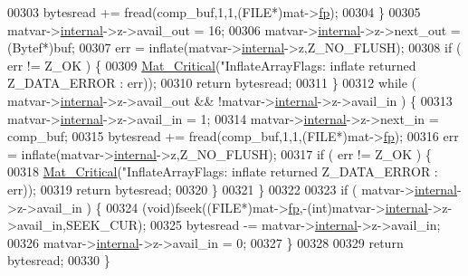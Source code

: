 \begin{DoxyCode}
{{{{{{00303         bytesread += fread(comp\_buf,1,1,(FILE*)mat->\hyperlink{struct__mat__t_a85f562e407ca9ad4d2a6e14f839432b7}{fp});
00304     \}
00305     matvar->\hyperlink{group___m_a_t_a6e97e3ed9f40c49322c18561c2a94e92}{internal}->z->avail\_out = 16;
00306     matvar->\hyperlink{group___m_a_t_a6e97e3ed9f40c49322c18561c2a94e92}{internal}->z->next\_out = (Bytef*)buf;
00307     err = inflate(matvar->\hyperlink{group___m_a_t_a6e97e3ed9f40c49322c18561c2a94e92}{internal}->z,Z\_NO\_FLUSH);
00308     \textcolor{keywordflow}{if} ( err != Z\_OK ) \{
00309         \hyperlink{group__mat__util_gaf51f2bfbb5580f575e4dd79757e2b80c}{Mat\_Critical}(\textcolor{stringliteral}{"InflateArrayFlags: inflate returned %
      Z\_DATA\_ERROR : err));
00310         \textcolor{keywordflow}{return} bytesread;
00311     \}
00312     \textcolor{keywordflow}{while} ( matvar->\hyperlink{group___m_a_t_a6e97e3ed9f40c49322c18561c2a94e92}{internal}->z->avail\_out && !matvar->\hyperlink{group___m_a_t_a6e97e3ed9f40c49322c18561c2a94e92}{internal}->z->avail\_in ) \{
00313         matvar->\hyperlink{group___m_a_t_a6e97e3ed9f40c49322c18561c2a94e92}{internal}->z->avail\_in = 1;
00314         matvar->\hyperlink{group___m_a_t_a6e97e3ed9f40c49322c18561c2a94e92}{internal}->z->next\_in = comp\_buf;
00315         bytesread += fread(comp\_buf,1,1,(FILE*)mat->\hyperlink{struct__mat__t_a85f562e407ca9ad4d2a6e14f839432b7}{fp});
00316         err = inflate(matvar->\hyperlink{group___m_a_t_a6e97e3ed9f40c49322c18561c2a94e92}{internal}->z,Z\_NO\_FLUSH);
00317         \textcolor{keywordflow}{if} ( err != Z\_OK ) \{
00318             \hyperlink{group__mat__util_gaf51f2bfbb5580f575e4dd79757e2b80c}{Mat\_Critical}(\textcolor{stringliteral}{"InflateArrayFlags: inflate returned %
      Z\_DATA\_ERROR : err));
00319             \textcolor{keywordflow}{return} bytesread;
00320         \}
00321     \}
00322 
00323     \textcolor{keywordflow}{if} ( matvar->\hyperlink{group___m_a_t_a6e97e3ed9f40c49322c18561c2a94e92}{internal}->z->avail\_in ) \{
00324         (void)fseek((FILE*)mat->\hyperlink{struct__mat__t_a85f562e407ca9ad4d2a6e14f839432b7}{fp},-(int)matvar->\hyperlink{group___m_a_t_a6e97e3ed9f40c49322c18561c2a94e92}{internal}->z->avail\_in,SEEK\_CUR);
00325         bytesread -= matvar->\hyperlink{group___m_a_t_a6e97e3ed9f40c49322c18561c2a94e92}{internal}->z->avail\_in;
00326         matvar->\hyperlink{group___m_a_t_a6e97e3ed9f40c49322c18561c2a94e92}{internal}->z->avail\_in = 0;
00327     \}
00328 
00329     \textcolor{keywordflow}{return} bytesread;
00330 \}
}}}}}}}}
\end{DoxyCode}
